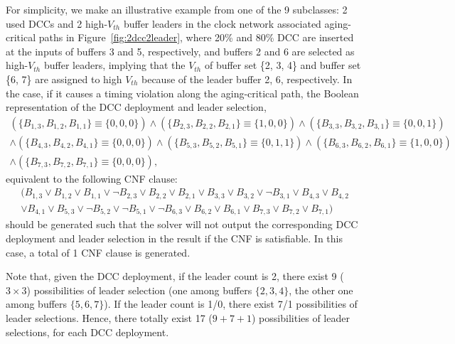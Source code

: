 For simplicity, we make an illustrative example from one of the 9 subclasses: 2 used DCCs and 2 high-$V_{th}$ buffer leaders in the clock network associated aging-critical paths in Figure~\ref{fig:2dcc2leader}, where 20\% and 80\% DCC are inserted at the inputs of buffers 3 and 5, respectively, and buffers 2 and 6 are selected as high-$V_{th}$ buffer leaders, implying that the $V_{th}$ of buffer set \{2, 3, 4\} and buffer set \{6, 7\} are assigned to high $V_{th}$ because of the leader buffer 2, 6, respectively. In the case, if it causes a timing violation along the aging-critical path, the Boolean representation of the DCC deployment and leader selection,
{\fontsize{9}{10}
\begin{gather*}
\left(\{B_{1,3}, B_{1,2}, B_{1,1}\} \equiv \{0, 0, 0\} \right) \land \left( \{B_{2,3}, B_{2,2}, B_{2,1}\} \equiv \{1, 0, 0\} \right) \land \left(\{B_{3,3}, B_{3,2}, B_{3,1}\} \equiv \{0, 0, 1\} \right) \\ 
\land \left( \{B_{4,3}, B_{4,2}, B_{4,1}\} \equiv \{0, 0, 0\} \right) \land \left(\{B_{5,3}, B_{5,2}, B_{5,1}\} \equiv \{0, 1, 1\} \right) \land \left( \{B_{6,3}, B_{6,2}, B_{6,1}\} \equiv \{1, 0, 0\} \right)\\
\land \left( \{B_{7,3}, B_{7,2}, B_{7,1}\} \equiv \{0, 0, 0\} \right),
\end{gather*}}equivalent to the following CNF clause:
{\fontsize{9}{10}
\begin{gather*}
(B_{1,3} \lor B_{1,2} \lor B_{1,1} \lor \neg B_{2,3} \lor B_{2,2} \lor B_{2,1}  \lor B_{3,3} \lor B_{3,2} \lor \neg B_{3,1} \lor B_{4,3} \lor B_{4,2} \\
\lor B_{4,1} \lor B_{5,3} \lor \neg B_{5,2} \lor \neg B_{5,1} \lor \neg  B_{6,3} \lor B_{6,2} \lor B_{6,1} \lor B_{7,3} \lor B_{7,2} \lor B_{7,1} )
\end{gather*}}should be generated such that the solver will not output the corresponding DCC deployment and leader selection in the result if the CNF is satisfiable. In this case, a total of 1 CNF clause is generated.

Note that, given the DCC deployment, if the leader count is 2, there exist 9 ($3 \times 3$) possibilities of leader selection (one among buffers $\{2, 3, 4\}$, the other one among buffers $\{5, 6, 7\}$).
If the leader count is 1/0, there exist 7/1 possibilities of leader selections. Hence, there totally exist 17 ($9+7+1$) possibilities of leader selections, for each DCC deployment.




